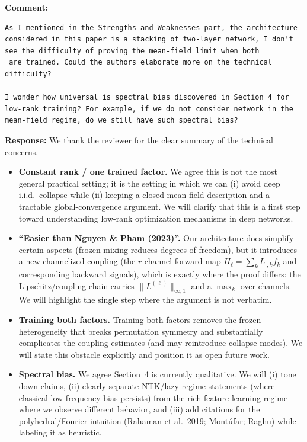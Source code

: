 \documentclass[11pt,a4paper]{article}
\newcommand{\NP}{Nguyen \& Pham (2023)}
\begin{document}
\textbf{Comment:}
\begin{verbatim}
As I mentioned in the Strengths and Weaknesses part, the architecture considered in this paper is a stacking of two-layer network, I don't see the difficulty of proving the mean-field limit when both
 are trained. Could the authors elaborate more on the technical difficulty?

I wonder how universal is spectral bias discovered in Section 4 for low-rank training? For example, if we do not consider network in the mean-field regime, do we still have such spectral bias?
\end{verbatim}
\textbf{Response:} We thank the reviewer for the clear summary of the technical concerns.
\begin{itemize}
  \item \textbf{Constant rank / one trained factor.} We agree this is not the most general practical setting; it is the setting in which we can (i) avoid deep i.i.d.\ collapse while (ii) keeping a closed mean-field description and a tractable global-convergence argument. We will clarify that this is a first step toward understanding low-rank optimization mechanisms in deep networks.
  \item \textbf{``Easier than \NP{}''.} Our architecture does simplify certain aspects (frozen mixing reduces degrees of freedom), but it introduces a new channelized coupling (the $r$-channel forward map $H_\ell=\sum_k L_{\cdot,k}f_k$ and corresponding backward signals), which is exactly where the proof differs: the Lipschitz/coupling chain carries $\|L^{(\ell)}\|_{\infty,1}$ and a $\max_k$ over channels. We will highlight the single step where the argument is not verbatim.
  \item \textbf{Training both factors.} Training both factors removes the frozen heterogeneity that breaks permutation symmetry and substantially complicates the coupling estimates (and may reintroduce collapse modes). We will state this obstacle explicitly and position it as open future work.
  \item \textbf{Spectral bias.} We agree Section~4 is currently qualitative. We will (i) tone down claims, (ii) clearly separate NTK/lazy-regime statements (where classical low-frequency bias persists) from the rich feature-learning regime where we observe different behavior, and (iii) add citations for the polyhedral/Fourier intuition (Rahaman et al.\ 2019; Mont\'ufar; Raghu) while labeling it as heuristic.
\end{itemize}
\end{document}
